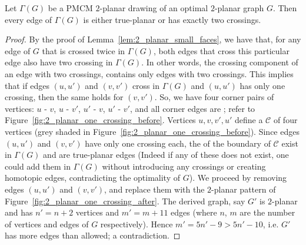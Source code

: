 \begin{lemma}\label{lem:2_planar_one_crossing}
Let $\Gamma(G)$ be a PMCM $2$-planar drawing of an optimal $2$-planar graph $G$. Then every edge of $\Gamma(G)$ is either true-planar or has exactly two crossings.
\end{lemma}
\begin{proof}
By the proof of Lemma~\ref{lem:2_planar_small_faces}, we have that, for any edge 
of $G$ that is crossed twice in $\Gamma(G)$, both edges that cross this 
particular edge also have two crossing in $\Gamma(G)$. In other words, the 
crossing component of an edge with two crossings, contains only edges with two 
crossings. This implies that if edges $(u,u')$ and $(v,v')$ cross in $\Gamma(G)$ 
and $(u,u')$ has only one crossing, then the same holds for $(v,v')$. So, we have four corner pairs of  vertices: $u$ - $v$, $u$ - $v'$, $u'$ - $v$, $u'$ - $v'$, and all corner 
edges are \pes; refer to Figure~\ref{fig:2_planar_one_crossing_before}. Vertices 
 $u,v,v',u'$ define a \pp $\mathcal{C}$ of four vertices (grey shaded in 
Figure~\ref{fig:2_planar_one_crossing_before}). Since edges $(u,u')$ and 
$(v,v')$ have only one crossing each, the \pes of the boundary of $\mathcal{C}$ 
exist in $\Gamma(G)$ and are true-planar edges (Indeed if any of these \pes does 
not exist, one could add them in $\Gamma(G)$ without introducing any crossings 
or creating homotopic edges, contradicting the optimality of $G$). We proceed by 
removing  edges $(u,u')$ and $(v,v')$, and replace them with the $2$-planar 
pattern of Figure~\ref{fig:2_planar_one_crossing_after}. The derived graph, say 
$G'$ is $2$-planar and has $n'=n+2$ vertices and $m'=m+11$ edges (where $n$, $m$ 
are the number of vertices and edges of $G$ respectively). Hence 
$m'=5n'-9>5n'-10$, i.e. $G'$ has more edges than allowed; a contradiction.


\end{proof}
